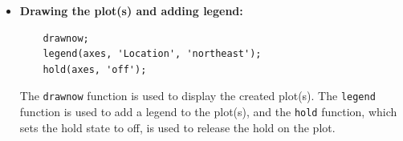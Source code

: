 \documentclass[13pt,a4paper]{report}
\begin{document}
\begin{itemize}[leftmargin=0.1cm]
\begin{verbatim}
    |\setcounter{FancyVerbLine}{65}|if PEVisibility
        plot(axes, T, PE, 'Color', 'blue', 'LineWidth', 1.5, 'DisplayName', 'PE');
    end
\end{verbatim}

The code checks if the visibility of kinetic and potential energy plots is set to true. If it is, the respective plots are created using the plot function.

\item \textbf{Drawing the plot(s) and adding legend:}

\begin{verbatim}
    drawnow;
    legend(axes, 'Location', 'northeast');
    hold(axes, 'off');
\end{verbatim}

The \texttt{drawnow} function is used to display the created plot(s). The \texttt{legend} function is used to add a legend to the plot(s), and the \texttt{hold} function, which sets the hold state to off, is used to release the hold on the plot.

\end{itemize}

\newpage
\end{document}

